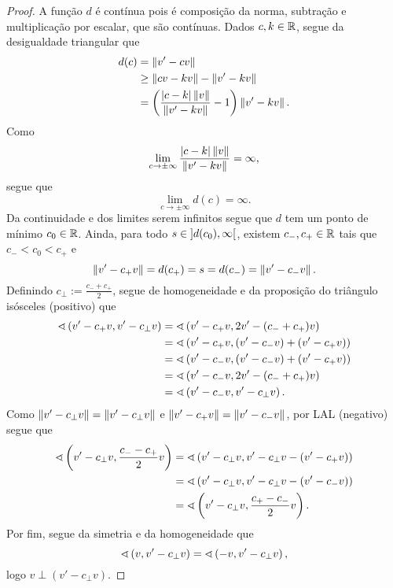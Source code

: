 \begin{proof}
A função $d$ é contínua pois é composição da norma, subtração e multiplicação por escalar, que são contínuas. Dados $c,k \in \mathbb{R}$, segue da desigualdade triangular que
	\begin{align*}
		d(c) &= \left\Vert{v'-cv}\right\Vert \\
			&\geq \left\Vert{cv-kv}\right\Vert - \left\Vert{v'-kv}\right\Vert \\
			&=\left( \frac{\left\vert{c-k}\right\vert\left\Vert{v}\right\Vert}{\left\Vert{v'-kv}\right\Vert} - 1 \right) \left\Vert{v'-kv}\right\Vert.
	\end{align*}
Como
	\begin{equation*}
		\lim_{c \to \pm\infty} \frac{\left\vert{c-k}\right\vert\left\Vert{v}\right\Vert}{\left\Vert{v'-kv}\right\Vert} = \infty,
	\end{equation*}
segue que
	\begin{equation*}
		\lim_{c \to \pm\infty} d(c) = \infty.
	\end{equation*}
Da continuidade e dos limites serem infinitos segue que $d$ tem um ponto de mínimo $c_0 \in \mathbb{R}$. Ainda, para todo $s \in \left]{d(c_0)},{\infty}\right[$, existem $c_-,c_+ \in \mathbb{R}$ tais que $c_- < c_0 < c_+$ e
	\begin{equation*}
		\left\Vert{v'-c_+v}\right\Vert = d(c_+) = s = d(c_-) = \left\Vert{v'-c_-v}\right\Vert.
	\end{equation*}
Definindo $c_{\perp} := \frac{c_-+c_+}{2}$, segue de homogeneidade e da proposição do triângulo isósceles (positivo) que
	\begin{align*}
		\sphericalangle\left({v'-c_+v},{v'-c_{\perp}v}\right) &= \sphericalangle\left({v'-c_+v},{2v'-(c_-+c_+)v}\right) \\
			&= \sphericalangle\left({v'-c_+v},{(v'-c_-v)+(v'-c_+v)}\right) \\
			&= \sphericalangle\left({v'-c_-v},{(v'-c_-v)+(v'-c_+v)}\right) \\
			&= \sphericalangle\left({v'-c_-v},{2v'-(c_-+c_+)v}\right) \\
			&= \sphericalangle\left({v'-c_-v},{v'-c_{\perp}v}\right).
	\end{align*}
Como $\left\Vert{v'-c_{\perp}v}\right\Vert = \left\Vert{v'-c_{\perp}v}\right\Vert$ e $\left\Vert{v'-c_+v}\right\Vert = \left\Vert{v'-c_-v}\right\Vert$, por LAL (negativo) segue que
	\begin{align*}
		\sphericalangle\left({v'-c_{\perp}v},{\frac{c_--c_+}{2}v}\right) &= \sphericalangle\left({v'-c_{\perp}v},{v'-c_{\perp}v - (v'-c_+v)}\right) \\
			&= \sphericalangle\left({v'-c_{\perp}v},{v'-c_{\perp}v - (v'-c_-v)}\right) \\
			&= \sphericalangle\left({v'-c_{\perp}v},{\frac{c_+-c_-}{2}v}\right).
	\end{align*}
Por fim, segue da simetria e da homogeneidade que
	\begin{equation*}
		\sphericalangle\left({v},{v'-c_{\perp}v}\right) = \sphericalangle\left({-v},{v'-c_{\perp}v}\right),
	\end{equation*}
logo $v \perp (v'-c_{\perp}v)$.


\end{proof}
